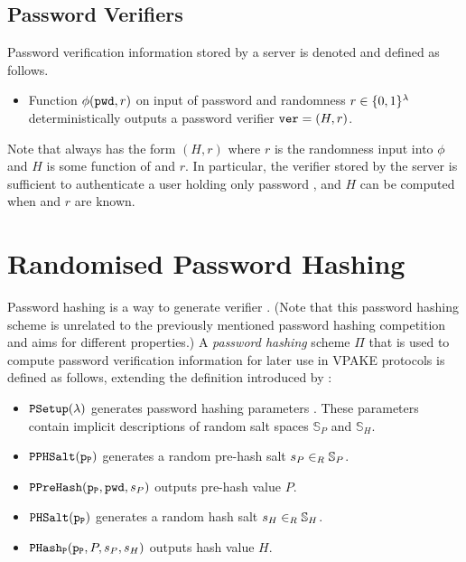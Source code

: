 \subsection{Password Verifiers}
Password verification information stored by a server is denoted \ver and defined as follows.
\begin{itemize}
  \item Function $\phi(\mathtt{pwd}, r)$ on input of password \pwd and randomness $r\in\{0,1\}^\lambda$ deterministically outputs a password verifier $\mathtt{ver}=(H,r)$.
\end{itemize}
Note that \ver always has the form $(H, r)$ where $r$ is the randomness input into $\phi$ and $H$ is some function of \pwd and $r$.
In particular, the verifier \ver stored by the server is sufficient to authenticate a user holding only password \pwd, and $H$ can be computed when \pwd and $r$ are known.



\section{Randomised Password Hashing} \label{sec:strucphash}
Password hashing is a way to generate verifier \ver.
(Note that this password hashing scheme is unrelated to the previously mentioned password hashing competition and aims for different properties.)
A \emph{password hashing} scheme $\Pi$ that is used to compute password verification information \ver for later use in \ac{VPAKE} protocols is defined as follows, extending the definition introduced by \citet{BenhamoudaP13}:

\begin{itemize}
	\item $\mathtt{PSetup}(\lambda)$ generates password hashing parameters \paramP. 
	  These parameters contain implicit descriptions of random salt spaces $\mathbb{S}_P$ and $\mathbb{S}_H$.
	\item $\mathtt{PPHSalt}(\mathtt{p_P})$ generates a random pre-hash salt $s_P\in_R\mathbb{S}_P$.
	\item $\mathtt{PPreHash}(\mathtt{p_P}, \mathtt{pwd}, s_P)$ outputs pre-hash value $P$.
	\item $\mathtt{PHSalt}(\mathtt{p_P})$ generates a random hash salt $s_H\in_R\mathbb{S}_H$.
	\item $\mathtt{PHash_P}(\mathtt{p_P}, P, s_P, s_H)$ outputs hash value $H$.
\end{itemize}

